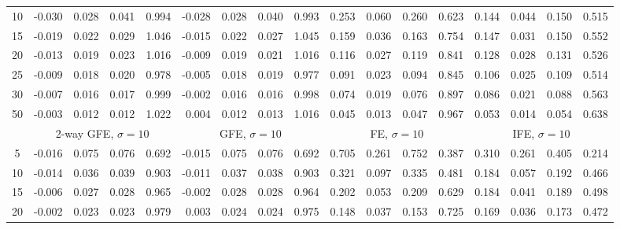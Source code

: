 \documentclass{article}
\begin{document}
{\begin{tabular}{c r r r r r r r r r r r r r r r r}
10 &     -0.030 &      0.028 &      0.041 &      0.994 &     -0.028 &      0.028 &      0.040 &      0.993 &      0.253 &      0.060 &      0.260 &      0.623 &      0.144 &      0.044 &      0.150 &      0.515\\
15 &     -0.019 &      0.022 &      0.029 &      1.046 &     -0.015 &      0.022 &      0.027 &      1.045 &      0.159 &      0.036 &      0.163 &      0.754 &      0.147 &      0.031 &      0.150 &      0.552\\
20 &     -0.013 &      0.019 &      0.023 &      1.016 &     -0.009 &      0.019 &      0.021 &      1.016 &      0.116 &      0.027 &      0.119 &      0.841 &      0.128 &      0.028 &      0.131 &      0.526\\
25 &     -0.009 &      0.018 &      0.020 &      0.978 &     -0.005 &      0.018 &      0.019 &      0.977 &      0.091 &      0.023 &      0.094 &      0.845 &      0.106 &      0.025 &      0.109 &      0.514\\
30 &     -0.007 &      0.016 &      0.017 &      0.999 &     -0.002 &      0.016 &      0.016 &      0.998 &      0.074 &      0.019 &      0.076 &      0.897 &      0.086 &      0.021 &      0.088 &      0.563\\
50 &     -0.003 &      0.012 &      0.012 &      1.022 &      0.004 &      0.012 &      0.013 &      1.016 &      0.045 &      0.013 &      0.047 &      0.967 &      0.053 &      0.014 &      0.054 &      0.638\\[0pt]
 & \multicolumn{ 4 }{c}{ 2-way GFE, $\sigma{=}1$0} & \multicolumn{ 4 }{c}{ GFE, $\sigma{=}1$0} & \multicolumn{ 4 }{c}{ FE, $\sigma{=}1$0} & \multicolumn{ 4 }{c}{ IFE, $\sigma{=}1$0}\\[-3pt]
 \cmidrule(lr){2-5}  \cmidrule(lr){6-9}  \cmidrule(lr){10-13}  \cmidrule(lr){14-17}
5 &     -0.016 &      0.075 &      0.076 &      0.692 &     -0.015 &      0.075 &      0.076 &      0.692 &      0.705 &      0.261 &      0.752 &      0.387 &      0.310 &      0.261 &      0.405 &      0.214\\
10 &     -0.014 &      0.036 &      0.039 &      0.903 &     -0.011 &      0.037 &      0.038 &      0.903 &      0.321 &      0.097 &      0.335 &      0.481 &      0.184 &      0.057 &      0.192 &      0.466\\
15 &     -0.006 &      0.027 &      0.028 &      0.965 &     -0.002 &      0.028 &      0.028 &      0.964 &      0.202 &      0.053 &      0.209 &      0.629 &      0.184 &      0.041 &      0.189 &      0.498\\
20 &     -0.002 &      0.023 &      0.023 &      0.979 &      0.003 &      0.024 &      0.024 &      0.975 &      0.148 &      0.037 &      0.153 &      0.725 &      0.169 &      0.036 &      0.173 &      0.472\\

\end{tabular}}
\end{document}
